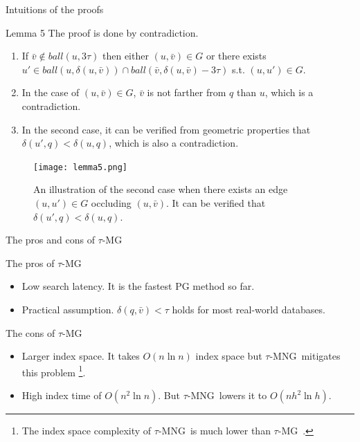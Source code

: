 \documentclass[12pt]{beamer}
\newcommand{\tauMG}{$\tau$-MG\ }
\newcommand{\tauMNG}{$\tau$-MNG\ }
\begin{document}
\begin{frame}[allowframebreaks]{Intuitions of the proofs}
  \begin{block}{Lemma 5}
    \small
    The proof is done by contradiction. 
    \begin{enumerate}
      \item If $\bar{v} \notin ball(u, 3\tau)$ then either $(u, \bar{v}) \in G$ or there exists $u' \in ball(u, \delta(u, \bar{v})) \cap ball(\bar{v}, \delta(u, \bar{v}) - 3\tau)$ s.t. $(u, u') \in G$. 
      \item In the case of $(u, \bar{v}) \in G$, $\bar{v}$ is not farther from $q$ than $u$, which is a contradiction. 
      \item In the second case, it can be verified from geometric properties that $\delta(u', q) < \delta(u, q)$, which is also a contradiction.
    \end{enumerate}
  \end{block}
  \begin{figure}
    \texttt{[image: lemma5.png]}
    \caption{An illustration of the second case when there exists an edge $(u, u') \in G$ occluding $(u, \bar{v})$. It can be verified that $\delta(u', q) < \delta(u, q)$.}
  \end{figure}
\end{frame}

\begin{frame}{The pros and cons of \tauMG}
  \begin{block}{The pros of \tauMG}
    \begin{itemize}
      \item Low search latency. It is the fastest PG method so far.
      \item Practical assumption. $\delta(q, \bar{v}) < \tau$ holds for most real-world databases.
    \end{itemize}
  \end{block}
  \begin{block}{The cons of \tauMG}
    \begin{itemize}
      \item Larger index space. It takes $O(n\ln n)$ index space but \tauMNG mitigates this problem \footnote{The index space complexity of \tauMNG is much lower than \tauMG.}.
      \item High index time of $O(n^2 \ln n)$. But \tauMNG lowers it to $O(nh^2\ln h)$. 
    \end{itemize}
  \end{block}
\end{frame}
\end{document}
